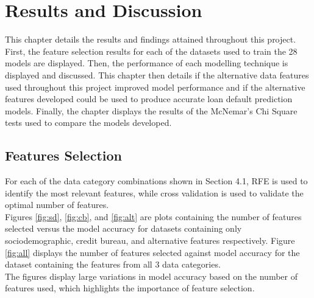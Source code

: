 \chapter{Results and Discussion} 
\label{Chapter5}

This chapter details the results and findings attained throughout this project. First, the feature selection results for each of the datasets used to train the 28 models are displayed. Then, the performance of each modelling technique is displayed and discussed. This chapter then details if the alternative data features used throughout this project improved model performance and if the alternative features developed could be used to produce accurate loan default prediction models. Finally, the chapter displays the results of the McNemar's Chi Square tests used to compare the models developed.   


\section{Features Selection}

For each of the data category combinations shown in Section 4.1, RFE is used to identify the most relevant features, while cross validation is used to validate the optimal number of features. \\

Figures \ref{fig:sd}, \ref{fig:cb}, and \ref{fig:alt} are plots containing the number of features selected versus the model accuracy for datasets containing only sociodemographic, credit bureau, and alternative features respectively. Figure \ref{fig:all} displays the number of features selected against model accuracy for the dataset containing the features from all 3 data categories. \\

The figures display large variations in model accuracy based on the number of features used, which highlights the importance of feature selection.

\vspace{10 pt}

